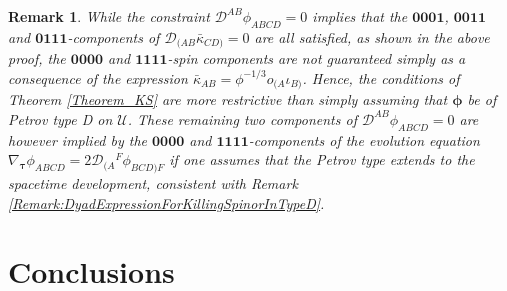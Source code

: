 \documentclass[10pt,a4paper]{article}
\theoremstyle{plain}
\newtheorem{remark}{Remark}
\begin{document}
\begin{remark}{\em 
 While the constraint $\mathcal{D}^{AB}\phi_{ABCD}=0$ implies that the $\bm0\bm0\bm0\bm1$, $\bm0\bm0\bm1\bm1$ and $\bm0\bm1\bm1\bm1$-components of $\mathcal{D}_{(AB}\bar{\kappa}_{CD)}=0$
  are all satisfied, as shown in the above proof, the $\bm0\bm0\bm0\bm0$ and $\bm1\bm1\bm1\bm1$-spin components are not guaranteed simply as a consequence of the expression $\bar{\kappa}_{AB}=\phi^{-1/3}o_{(A}\iota_{B)}$. Hence, the conditions of Theorem \ref{Theorem_KS} are more restrictive than simply assuming that $\bm\phi$ be of Petrov type D on $\mathcal{U}$. These remaining two components of $\mathcal{D}^{AB}\phi_{ABCD}=0$ are however implied by the $\bm0\bm0\bm0\bm0$ and $\bm1\bm1\bm1\bm1$-components of the \emph{evolution equation} $\nabla_{\bm\tau}\phi_{ABCD}=2\mathcal{D}_{(A}{}^F\phi_{BCD)F}$ if one \emph{assumes} that the Petrov type extends to the spacetime development, consistent with Remark \ref{Remark:DyadExpressionForKillingSpinorInTypeD}.
  }
\end{remark}


\section*{Conclusions}
\end{document}
